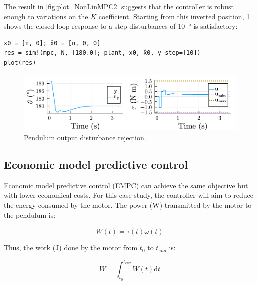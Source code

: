 The result in \cref{fig:plot_NonLinMPC2} suggests that the controller is robust enough to variations on the $K$ coefficient. Starting from this inverted position, \cref{fig:plot_NonLinMPC3} shows the closed-loop response to a step disturbances of \SI{10}{\degree} is satisfactory:
\begin{verbatim}
x0 = [π, 0]; x̂0 = [π, 0, 0]
res = sim!(mpc, N, [180.0]; plant, x0, x̂0, y_step=[10])
plot(res)
\end{verbatim}

\begin{figure}[h]
    \centering
    \includegraphics[width=\columnwidth]{fig/plot_NonLinMPC3.pdf}
    \caption{Pendulum output disturbance rejection.}
    \label{fig:plot_NonLinMPC3}
\end{figure}



\subsection{Economic model predictive control}

Economic model predictive control (EMPC) can achieve the same objective but with lower economical costs. For this case study, the controller will aim to reduce the energy consumed by the motor. The power (W) transmitted by the motor to the pendulum is:

\begin{equation}
\dot{W}(t) = \tau(t) \omega(t) 
\end{equation}

Thus, the work (J) done by the motor from $t_0$ to $t_{end}$ is:

\begin{equation}
W = \int_{t_0}^{t_{end}} \dot{W}(t) \mathrm{d}t 
\end{equation}

